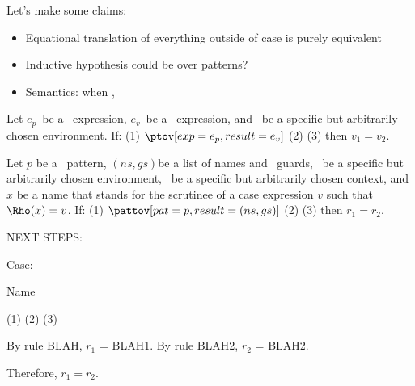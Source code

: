 \documentclass[]{article}
\begin{document}

Let's make some claims: 

\begin{itemize}
    \item Equational translation of everything outside of case is purely equivalent 
    \item Inductive hypothesis could be over patterns? 
    \item Semantics: when \prun, \vmrung
\end{itemize}

\newcommand\translatesto\rightsquigarrow

\newcommand\ep{\ensuremath{e_{p}}}
\newcommand\ev{\ensuremath{e_{v}}}
\newcommand\nsgs{\ensuremath{(ns, gs)}}


Let \ep\ be a \PPlus\ expression, \ev\ be a \VMinus\ expression, and \Rho\
be a specific but arbitrarily chosen environment. If: (1) $\ptov[exp=\ep, result=\ev]$
(2) \prun[exp=\ep, value=v_{1}] (3) \vmrung[guard=\ev, result=v_{2}]
then $v_{1} = v_{2}$.

Let $p$ be a \PPlus\ pattern, \nsgs be a list of names and \VMinus\ guards,
\Rho\ be a specific but arbitrarily chosen environment, \context\ be a specific
but arbitrarily chosen context, and $x$ be a name that stands for the scrutinee
of a case expression $v$ such that $\Rho(x) = v$. If: (1) $\pattov[pat=p,
result=\nsgs]$ (2) \pmatch[newenv=r_{1}] (3)
\vmgs[result=r_{2}] then $r_{1} = r_{2}$.


NEXT STEPS:


Case: 

Name 

(1) \pattov[pat=y, result={(y, [x = y])}] (2) \pmatch[pat=y, newenv=r_{1}] (3) \vmgs[envext=\bracketed{y \mapsto \rho(x)}, guards={[x = y]}, solution=r_{2}]

By rule BLAH, $r_{1}$ = BLAH1. 
By rule BLAH2, $r_{2}$ = BLAH2. 

Therefore, $r_{1} = r_{2}$. 
\end{document}
